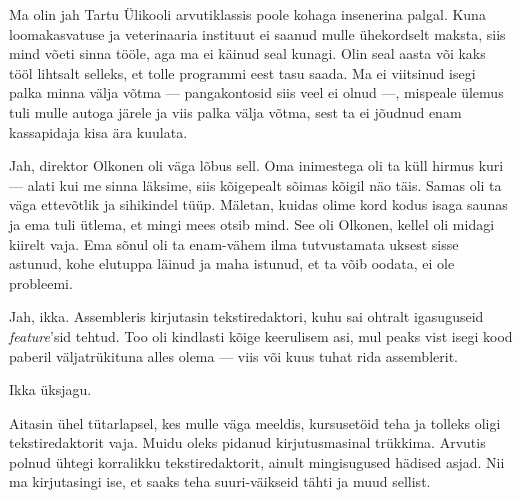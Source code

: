 
Ma olin jah Tartu Ülikooli arvutiklassis poole kohaga insenerina palgal. 
Kuna loomakasvatuse ja veterinaaria instituut ei saanud mulle 
ühekordselt maksta, siis mind võeti sinna tööle, aga ma ei käinud 
seal kunagi. Olin seal aasta või kaks tööl lihtsalt selleks, et tolle 
programmi eest tasu saada. Ma ei viitsinud isegi palka minna välja 
võtma --- pangakontosid siis veel ei olnud ---, mispeale ülemus tuli mulle autoga järele ja 
viis palka välja võtma, sest ta ei jõudnud enam kassapidaja kisa ära 
kuulata.


Jah, direktor Olkonen oli väga lõbus sell. Oma inimestega oli ta küll hirmus 
kuri --- alati kui me sinna läksime, siis kõigepealt sõimas kõigil näo täis. 
Samas oli ta väga ettevõtlik ja sihikindel tüüp. Mäletan, kuidas olime kord kodus isaga saunas ja 
ema tuli ütlema, et mingi mees otsib mind. See oli Olkonen, kellel
oli midagi kiirelt vaja. Ema sõnul oli ta enam-vähem ilma 
tutvustamata uksest sisse astunud, kohe elutuppa läinud ja maha istunud, et ta 
võib oodata, ei ole probleemi.


Jah, ikka. Assembleris kirjutasin tekstiredaktori, kuhu sai 
ohtralt igasuguseid \emph{feature}'sid tehtud. Too oli kindlasti kõige 
keerulisem asi, mul peaks vist isegi kood paberil väljatrükituna 
alles olema --- viis või kuus tuhat rida assemblerit. 


Ikka üksjagu. 


Aitasin ühel tütarlapsel, kes mulle väga meeldis, kursusetöid teha 
ja tolleks oligi tekstiredaktorit vaja. Muidu oleks pidanud 
kirjutusmasinal trükkima. Arvutis polnud ühtegi korralikku tekstiredaktorit, ainult mingisugused hädised asjad. Nii ma kirjutasingi ise,
et saaks teha suuri-väikseid tähti ja muud sellist.


